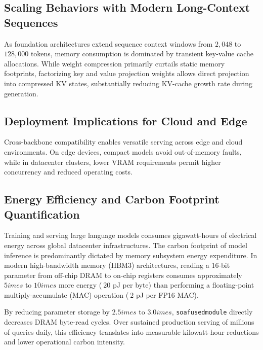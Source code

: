 \subsection{Scaling Behaviors with Modern Long-Context Sequences}
As foundation architectures extend sequence context windows from $2{,}048$ to $128{,}000$ tokens, memory consumption is dominated by transient key-value cache allocations. While weight compression primarily curtails static memory footprints, factorizing key and value projection weights allows direct projection into compressed KV states, substantially reducing KV-cache growth rate during generation.

\subsection{Deployment Implications for Cloud and Edge}
Cross-backbone compatibility enables versatile serving across edge and cloud environments. On edge devices, compact models avoid out-of-memory faults, while in datacenter clusters, lower VRAM requirements permit higher concurrency and reduced operating costs.

\subsection{Energy Efficiency and Carbon Footprint Quantification}
Training and serving large language models consumes gigawatt-hours of electrical energy across global datacenter infrastructures. The carbon footprint of model inference is predominantly dictated by memory subsystem energy expenditure. In modern high-bandwidth memory (HBM3) architectures, reading a 16-bit parameter from off-chip DRAM to on-chip registers consumes approximately $5	imes$ to $10	imes$ more energy ($~20$ pJ per byte) than performing a floating-point multiply-accumulate (MAC) operation ($~2$ pJ per FP16 MAC).

By reducing parameter storage by $2.5	imes$ to $3.0	imes$, \texttt{soafusedmodule} directly decreases DRAM byte-read cycles. Over sustained production serving of millions of queries daily, this efficiency translates into measurable kilowatt-hour reductions and lower operational carbon intensity.
